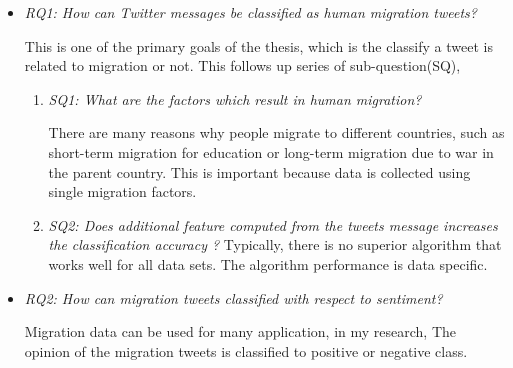 \begin{itemize}

    \item  \textit{RQ1: How can Twitter messages be classified as human migration tweets?}
    
    This is one of the primary goals of the thesis, which is the classify a tweet is related to migration or not. This follows up series of sub-question(SQ),
    
    \begin{enumerate}
        \item \textit{SQ1: What are the factors which result in human migration?}
        
        There are many reasons why people migrate to different countries, such as short-term migration for education or long-term migration due to war in the parent country. This is important because data is collected using single migration factors. 
        \item \textit{SQ2: Does additional feature computed from the tweets message increases the classification accuracy ?}
        Typically, there is no superior algorithm that works well for all data sets. The algorithm performance is data specific. 
        
    \end{enumerate}
    
    
  
    
    \item \textit{RQ2: How can migration tweets classified with respect to sentiment?}
    
    Migration data can be used for many application, in my research, The opinion of the migration tweets is classified to positive or negative class.
\end{itemize}